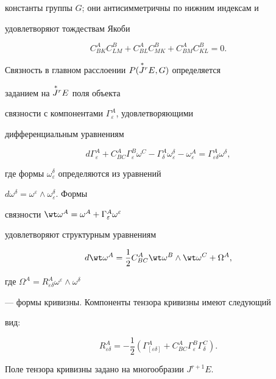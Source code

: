 константы группы $G$; они антисимметричны по нижним индексам и 


удовлетворяют тождествам Якоби 


$$ 


C^A_{B K}C^B_{L M}+C^A_{B L}C^B_{M K}+ 


C^A_{B M}C^B_{K L}=0. 


$$ 


Связность в главном расслоении $P(\overset{\,*}{J}{}^r E,G)$ определяется 


заданием на $\overset{\,*}{J}{}^r E$ поля объекта 


связности с компонентами $\Gamma^A_\varepsilon$, удовлетворяющими 


дифференциальным уравнениям 


$$ 


d\Gamma^A_\varepsilon+C^A_{B C}\Gamma^B_\varepsilon\omega^C- 


\Gamma^A_\delta\omega^\delta_\varepsilon- 


\omega^A_\varepsilon=\Gamma^A_{\varepsilon\delta}\omega^\delta, 


$$ 


где формы $\omega^\delta_\varepsilon$ определяются из уравнений 


$d\omega^\delta=\omega^\varepsilon\wedge\omega^\delta_\varepsilon$. Формы 


связности $\wt\omega^A=\omega^A+\Gamma^A_\varepsilon\omega^\varepsilon$ 


удовлетворяют структурным уравнениям 


$$ 


d\wt\omega^A=\frac{1}{2}C^A_{B C}\wt\omega^B\wedge\wt\omega^C+ 


\Omega^A, 


$$ 


где $\Omega^A=R^A_{\varepsilon\delta}\omega^\varepsilon\wedge\omega^\delta$ 


--- формы кривизны. Компоненты тензора кривизны имеют следующий 


вид: 


$$ 


R^A_{\varepsilon\delta}=-\frac{1}{2}(\Gamma^A_{[\varepsilon\delta]}+ 


C^A_{B C}\Gamma^B_\varepsilon\Gamma^C_\delta). 


$$ 


Поле тензора кривизны задано на многообразии $J^{r+1}E$. 


 


